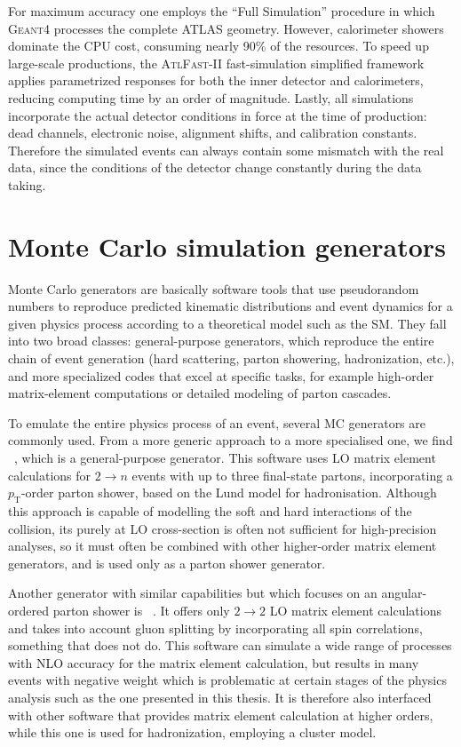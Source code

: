 For maximum accuracy one employs the “Full Simulation” procedure in which \textsc{Geant4} processes the complete ATLAS geometry.  However, calorimeter showers dominate the CPU cost, consuming nearly 90\% of the resources.  To speed up large-scale productions, the \textsc{AtlFast-II} fast-simulation simplified framework~\cite{Edmonds:1091969,ATLAS:1300517} applies parametrized responses for both the inner detector and calorimeters, reducing computing time by an order of magnitude.  Lastly, all simulations incorporate the actual detector conditions in force at the time of production: dead channels, electronic noise, alignment shifts, and calibration constants. Therefore the simulated events can always contain some mismatch with the real data, since the conditions of the detector change constantly during the data taking.


\section{Monte Carlo simulation generators}
\label{sec:mc}
Monte Carlo generators are basically software tools that use pseudorandom numbers to reproduce predicted kinematic distributions and event dynamics for a given physics process according to a theoretical model such as the SM.  They fall into two broad classes: general-purpose generators, which reproduce the entire chain of event generation (hard scattering, parton showering, hadronization, etc.), and more specialized codes that excel at specific tasks, for example high-order matrix-element computations or detailed modeling of parton cascades.

To emulate the entire physics process of an event, several MC generators are commonly used. From a more generic approach to a more specialised one, we find \pythia~\cite{SJOSTRAND2015159}, which is a general-purpose generator.
This software uses LO matrix element calculations for $2 \rightarrow n$ events with up to three final-state partons, incorporating a $p_{\text{T}}$-order parton shower, based on the Lund model for hadronisation. Although this approach is capable of modelling the soft and hard interactions of the collision, its purely at LO cross-section is often not sufficient for high-precision analyses, so it must often be combined with other higher-order matrix element generators, and is used only as a parton shower generator.

Another generator with similar capabilities but which focuses on an angular-ordered parton shower is \herwig~\cite{B_hr_2008}. It offers only $2 \rightarrow 2$ LO matrix element calculations and takes into account gluon splitting by incorporating all spin correlations, something that \pythia does not do. This software can simulate 
a wide range of processes with NLO accuracy for the matrix element calculation, but results in many events with negative weight which is problematic at certain stages of the physics analysis such as the one presented in this thesis. It is therefore also interfaced with other software that provides matrix element calculation at higher orders, while this one is used for hadronization, employing a cluster model.

